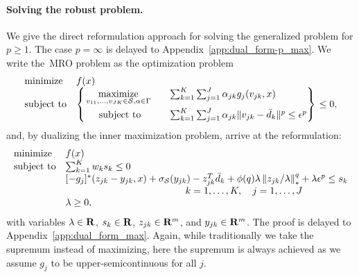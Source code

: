 \documentclass[12pt]{article}
\theoremstyle{thmstyleone}%
\theoremstyle{thmstyletwo}%
\theoremstyle{thmstylethree}%
\newcommand{\reviewChanges}{}
\begin{document}
\paragraph{\reviewChanges{Solving the robust problem.}}
\reviewChanges{We give the direct reformulation approach for solving the generalized problem for $p \geq 1$. The case $p = \infty$ is delayed to Appendix~\ref{app:dual_form-p_max}}.
\reviewChanges{We write the~\gls{MRO} problem as the optimization problem
\begin{equation}
	\label{eq:unif-const_max}
	\begin{array}{ll}
		\mbox{minimize} & f(x)\\
		\mbox{subject to} & \begin{dcases}
			\begin{rcases}
		\underset{v_{11},\dots,v_{JK} \in \mathcal{S}, \alpha \in \Gamma}{\text{maximize}} &\quad \sum_{k=1} ^K \sum_{j=1}^J \alpha_{jk} g_j(v_{jk}, x) \\
		\mbox{~~~~subject to} & \quad \sum_{k=1}^K \sum_{j=1}^J \alpha_{jk} \| v_{jk} - \bar{d}_k \|^p \le \epsilon^p\\
			\end{rcases}
			\end{dcases} \le 0,
	\end{array}
\end{equation}
and, by dualizing the inner maximization problem, arrive at the reformulation:}
\reviewChanges{
\begin{equation}
	\label{eq:robustopt_p_max}
	\begin{array}{ll}
		\mbox{minimize} & f(x)\\
		\mbox{subject to} & \sum_{k=1}^{K} w_k s_k  \le 0\\
		& [-g_j]^*(z_{jk} - y_{jk}, x) + \sigma_{{\supp}}(y_{jk}) - z_{jk}^T\bar{d}_k  + \phi(q)\lambda \left\|z_{jk}/\lambda \right\|^q_*  +\lambda \epsilon^p \leq s_k\\
		&\hspace{4cm} \quad k = 1,\dots, K, \quad j =1, \dots, J\\
		& \lambda \geq 0,
	\end{array}
\end{equation}
with variables $\lambda \in {\mathbf R}$, $s_k \in {\mathbf R}$, $z_{jk} \in {\mathbf R}^{m}$, and $y_{jk} \in {\mathbf R}^m$. The proof is delayed to Appendix~\ref{app:dual_form_max}.
Again, while traditionally we take the supremum instead of maximizing, here the supremum is always achieved as we assume \reviewChanges{$g_j$ to be upper-semicontinuous for all $j$.}}
\end{document}
